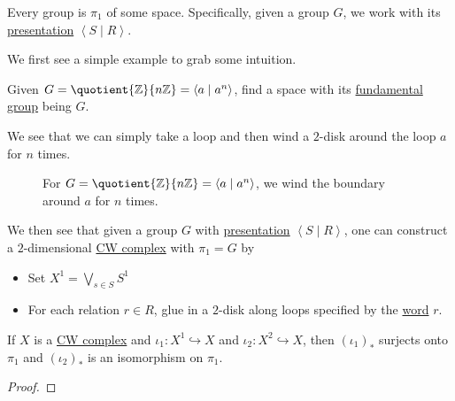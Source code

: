 \begin{remark}
	Every group is \(\pi _1\) of some space. Specifically, given a group \(G\), we work with its \hyperref[def:group-presentation]{presentation} \(\left< S\mid R \right> \).
\end{remark}
\begin{explanation}
	We first see a simple example to grab some intuition.
	\begin{eg}
		Given \(G = \quotient{\mathbb{\MakeUppercase{z}} }{n\mathbb{\MakeUppercase{z}} } = \left< a\mid a^n \right>\),
		find a space with its \hyperref[def:fundamental-group]{fundamental group} being \(G\).
	\end{eg}
	\begin{explanation}
		We see that we can simply take a loop and then wind a \(2\)-disk around the loop \(a\) for \(n\) times.
		\begin{figure}[H]
			\centering
			\caption{For \(G = \quotient{\mathbb{\MakeUppercase{z}}}{n\mathbb{\MakeUppercase{z}} } = \left< a \mid a^n \right> \), we wind the boundary around \(a\) for \(n\) times.}
			\label{fig:lec12-eg}
		\end{figure}
	\end{explanation}
	We then see that given a group \(G\) with \hyperref[def:group-presentation]{presentation} \(\left< S \mid R \right> \), one can construct a \(2\)-dimensional \hyperref[def:CW-Complex]{CW complex}
	with \(\pi _1 = G\) by
	\begin{itemize}
		\item Set \(X^1 = \bigvee_{s\in S} S^1\)
		\item For each relation \(r\in R\), glue in a \(2\)-disk along loops specified by the \hyperref[def:word]{word} \(r\).
	\end{itemize}
\end{explanation}

\begin{theorem}
	If \(X\) is a \hyperref[def:CW-Complex]{CW complex} and \(\iota _1\colon X^1\hookrightarrow X\) and \(\iota_2 \colon X^2\hookrightarrow X\),
	then \((\iota _1)_{\ast}\) surjects onto \(\pi _1\) and \((\iota _2)_{\ast}\) is an isomorphism on \(\pi _1\).
\end{theorem}
\begin{proof}
\end{proof}


